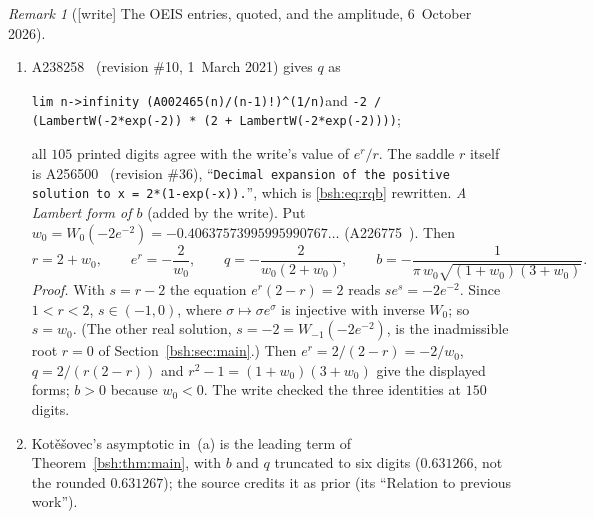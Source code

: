 \documentclass[11pt,letterpaper]{article}
\theoremstyle{remark}\newtheorem{remark}[theorem]{Remark}
\begin{document}
\begin{remark}[{[write]} The OEIS entries, quoted, and the amplitude, 6~October 2026]
\begin{enumerate}[label=(\alph*)]
 with the example ``\texttt{0.63126687887411546797...}'' and a link to
 page~249 of Kot\v e\v sovec's book. Its data print $105$ digits. Since
 $\Gamma(n)=(n-1)!$ and A238258 is $q$ (item~(c)), the case $J=0$ of
 Theorem~\ref{bsh:thm:main} says exactly that this limit is
 $b=e^r/(2\pi\sqrt{r^2-1})$: the source's closed form is the value of a
 constant that the entry gives only by its limit and its digits. The
 write evaluated $b$ at $150$ significant digits (mpmath); \emph{all $105$
 printed digits agree}, and the first $110$ decimals are
 \[
 \begin{aligned}
 b=0.&6312668788\ 7411546797\ 0048232579\ 7068795561\ 5469051446\ 1140892006\\
 &9734050854\ 1503766170\ 8560400850\ 1761109335\ 4635579420\ldots,
 \end{aligned}
 \]
 truncated, not rounded (the entry ends at the digit $5$ before
 $79420$). This is a closed form for the entry, not a correction of it.
 Nothing was submitted to the OEIS.
\item A238258~\cite{oeisbase} (revision \#10, 1~March 2021) gives $q$ as
 \begin{center}\small
 \parbox{0.92\textwidth}{\raggedright\texttt{lim n->infinity (A002465(n)/(n-1)!)\^{}(1/n)}\quad and\quad
 \texttt{-2 / (LambertW(-2*exp(-2)) * (2 + LambertW(-2*exp(-2))))};}
 \end{center}
 all
 $105$ printed digits agree with the write's value of $e^r/r$. The saddle
 $r$ itself is A256500~\cite{oeissaddle} (revision \#36), ``\texttt{Decimal
 expansion of the positive solution to x = 2*(1-exp(-x)).}'', which is
 \eqref{bsh:eq:rqb} rewritten. \emph{A Lambert form of $b$} (added by the
 write). Put $w_0=W_0(-2e^{-2})=-0.40637573995995990767\ldots$
 (A226775~\cite{oeislambert}). Then
 \[
  r=2+w_0,\qquad e^r=-\frac2{w_0},\qquad
  q=-\frac{2}{w_0(2+w_0)},\qquad
  b=-\frac{1}{\pi\,w_0\sqrt{(1+w_0)(3+w_0)}}.
 \]
 \emph{Proof.} With $s=r-2$ the equation $e^r(2-r)=2$ reads
 $se^s=-2e^{-2}$. Since $1<r<2$, $s\in(-1,0)$, where $\sigma\mapsto\sigma
 e^\sigma$ is injective with inverse $W_0$; so $s=w_0$. (The other real
 solution, $s=-2=W_{-1}(-2e^{-2})$, is the inadmissible root $r=0$ of
 Section~\ref{bsh:sec:main}.) Then $e^r=2/(2-r)=-2/w_0$,
 $q=2/(r(2-r))$ and $r^2-1=(1+w_0)(3+w_0)$ give the displayed forms; $b>0$
 because $w_0<0$. The write checked the three identities at $150$ digits.
\item Kot\v e\v sovec's asymptotic in~(a) is the leading term of
 Theorem~\ref{bsh:thm:main}, with $b$ and $q$ truncated to six digits
 ($0.631266$, not the rounded $0.631267$); the source credits it
 as prior (its ``Relation to previous work'').
\end{enumerate}
\end{remark}
\end{document}
